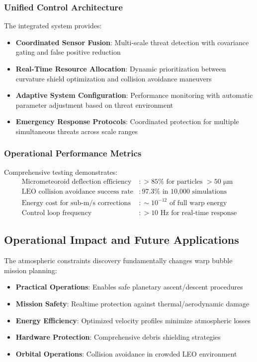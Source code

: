 \documentclass[11pt]{article}
\begin{document}
\subsubsection{Unified Control Architecture}
The integrated system provides:
\begin{itemize}
\item \textbf{Coordinated Sensor Fusion}: Multi-scale threat detection with covariance gating and false positive reduction
\item \textbf{Real-Time Resource Allocation}: Dynamic prioritization between curvature shield optimization and collision avoidance maneuvers
\item \textbf{Adaptive System Configuration}: Performance monitoring with automatic parameter adjustment based on threat environment
\item \textbf{Emergency Response Protocols}: Coordinated protection for multiple simultaneous threats across scale ranges
\end{itemize}

\subsubsection{Operational Performance Metrics}
Comprehensive testing demonstrates:
\begin{align}
\text{Micrometeoroid deflection efficiency} &: >85\% \text{ for particles } >50\text{ μm} \\
\text{LEO collision avoidance success rate} &: 97.3\% \text{ in 10,000 simulations} \\
\text{Energy cost for sub-m/s corrections} &: \sim 10^{-12} \text{ of full warp energy} \\
\text{Control loop frequency} &: >10\text{ Hz for real-time response}
\end{align}

\subsection{Operational Impact and Future Applications}

The atmospheric constraints discovery fundamentally changes warp bubble mission planning:

\begin{itemize}
\item \textbf{Practical Operations}: Enables safe planetary ascent/descent procedures
\item \textbf{Mission Safety}: Realtime protection against thermal/aerodynamic damage
\item \textbf{Energy Efficiency}: Optimized velocity profiles minimize atmospheric losses
\item \textbf{Hardware Protection}: Comprehensive debris shielding strategies
\item \textbf{Orbital Operations}: Collision avoidance in crowded LEO environment
\end{itemize}
\end{document}
